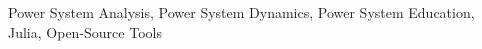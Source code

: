 \documentclass{IEEEtran4PSCC}
\begin{document}
\begin{IEEEkeywords}
Power System Analysis, Power System Dynamics, Power System Education, Julia, Open-Source Tools
\end{IEEEkeywords}


%
%
%
%
%
%
%
%
%
\end{document}
